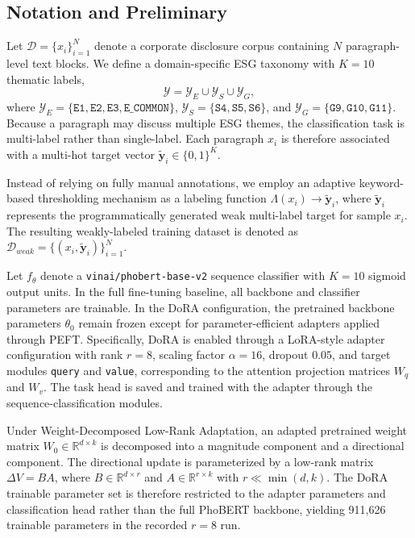 \documentclass{article}
\theoremstyle{plain}
\theoremstyle{definition}
\theoremstyle{remark}
\begin{document}
\subsection{Notation and Preliminary}
Let $\mathcal{D} = \{x_i\}_{i=1}^{N}$ denote a corporate disclosure corpus containing $N$ paragraph-level text blocks. We define a domain-specific ESG taxonomy with $K=10$ thematic labels,
\begin{equation}
    \mathcal{Y} = \mathcal{Y}_E \cup \mathcal{Y}_S \cup \mathcal{Y}_G,
\end{equation}
where $\mathcal{Y}_E=\{\texttt{E1}, \texttt{E2}, \texttt{E3}, \texttt{E\_COMMON}\}$, $\mathcal{Y}_S=\{\texttt{S4}, \texttt{S5}, \texttt{S6}\}$, and $\mathcal{Y}_G=\{\texttt{G9}, \texttt{G10}, \texttt{G11}\}$.
Because a paragraph may discuss multiple ESG themes, the classification task is multi-label rather than single-label. Each paragraph $x_i$ is therefore associated with a multi-hot target vector $\tilde{\mathbf{y}}_i \in \{0,1\}^{K}$.

Instead of relying on fully manual annotations, we employ an adaptive keyword-based thresholding mechanism as a labeling function $\Lambda(x_i) \rightarrow \tilde{\mathbf{y}}_i$, where $\tilde{\mathbf{y}}_i$ represents the programmatically generated weak multi-label target for sample $x_i$. The resulting weakly-labeled training dataset is denoted as $\mathcal{D}_{weak} = \{(x_i, \tilde{\mathbf{y}}_i)\}_{i=1}^{N}$.

Let $f_{\theta}$ denote a \texttt{vinai/phobert-base-v2} sequence classifier with $K=10$ sigmoid output units. In the full fine-tuning baseline, all backbone and classifier parameters are trainable. In the DoRA configuration, the pretrained backbone parameters $\theta_0$ remain frozen except for parameter-efficient adapters applied through PEFT. Specifically, DoRA is enabled through a LoRA-style adapter configuration with rank $r=8$, scaling factor $\alpha=16$, dropout $0.05$, and target modules \texttt{query} and \texttt{value}, corresponding to the attention projection matrices $W_q$ and $W_v$. The task head is saved and trained with the adapter through the sequence-classification modules.

Under Weight-Decomposed Low-Rank Adaptation, an adapted pretrained weight matrix $W_0 \in \mathbb{R}^{d \times k}$ is decomposed into a magnitude component and a directional component. The directional update is parameterized by a low-rank matrix $\Delta V = B A$, where $B \in \mathbb{R}^{d \times r}$ and $A \in \mathbb{R}^{r \times k}$ with $r \ll \min(d,k)$. The DoRA trainable parameter set is therefore restricted to the adapter parameters and classification head rather than the full PhoBERT backbone, yielding 911,626 trainable parameters in the recorded $r=8$ run.
\end{document}
